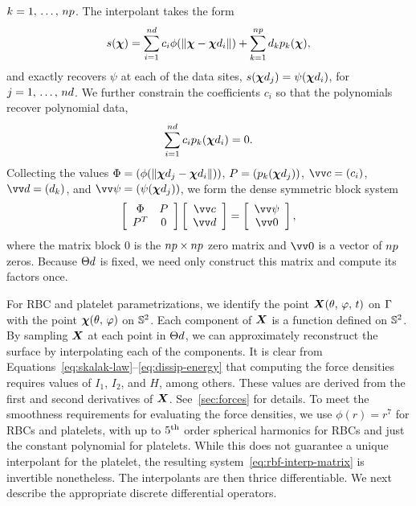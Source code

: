 $k=1,\,\ldots,\,\poly\cardinality$. The interpolant takes the form
\begin{equation}\label{eq:rbf-interp}
    s(\Xp)
    = \sum_{i=1}^{\data\cardinality} c_i \phi(\|\Xp-\data\Xp_i\|)
    + \sum_{k=1}^{\poly\cardinality} d_k p_k(\Xp),
\end{equation}
and exactly recovers $\psi$ at each of the data sites,
$s(\data\Xp_j) = \psi(\data\Xp_i)$, for $j = 1,\,\ldots,\,\data\cardinality$. We further
constrain the coefficients $c_i$ so that the polynomials recover polynomial data,
\begin{equation}
    \sum_{i=1}^{\data\cardinality} c_i p_k(\data\Xp_i) = 0.
    \label{eq:constraints}
\end{equation}
Collecting the values $\Phi=(\phi(\|\data\Xp_j-\data\Xp_i\|))$, $P=(p_k(\data\Xp_j))$,
$\arr{c} = (c_i)$, $\arr{d} = (d_k)$, and $\arr{\psi} = (\psi(\data\Xp_j))$, we form
the dense symmetric block system
\begin{equation}\label{eq:rbf-interp-matrix}
    \left[\begin{array}{cc}
            \Phi & P \\ P^T & 0
    \end{array}\right]\left[\begin{array}{c}
            \arr{c} \\ \arr{d}
    \end{array}\right] = \left[\begin{array}{c}
            \arr{\psi} \\ \arr{0}
    \end{array}\right],
\end{equation}
where the matrix block $0$ is the $\poly\cardinality\times\poly\cardinality$ zero matrix
and $\arr{0}$ is a vector of $\poly\cardinality$ zeros. Because $\data\sites$ is fixed,
we need only construct this matrix and compute its factors once.

For RBC and platelet parametrizations, we identify the point $\boldsymbol{X}(\theta,\,\varphi,\,t)$
on $\Gamma$ with the point $\boldsymbol{\chi}(\theta,\,\varphi)$ on $\mathbb{S}^2$. Each component of
$\boldsymbol{X}$ is a function defined on $\mathbb{S}^2$. By sampling $\boldsymbol{X}$ at each point in $\data\sites$,
we can approximately reconstruct the surface by interpolating each of the components. It
is clear from Equations~\eqref{eq:skalak-law}--\eqref{eq:dissip-energy} that computing
the force densities requires values of $I_1$, $I_2$, and $H$, among others. These values
are derived from the first and second derivatives of $\boldsymbol{X}$. See~\ref{sec:forces} for
details. To meet the smoothness requirements for evaluating the force densities, we use
$\phi(r) = r^7$ for RBCs and platelets, with up to $5\textsuperscript{th}$ order spherical harmonics for
RBCs and just the constant polynomial for platelets. While this does not guarantee a
unique interpolant for the platelet, the resulting system~\eqref{eq:rbf-interp-matrix} is
invertible nonetheless. The interpolants are then thrice differentiable. We next describe
the appropriate discrete differential operators.

